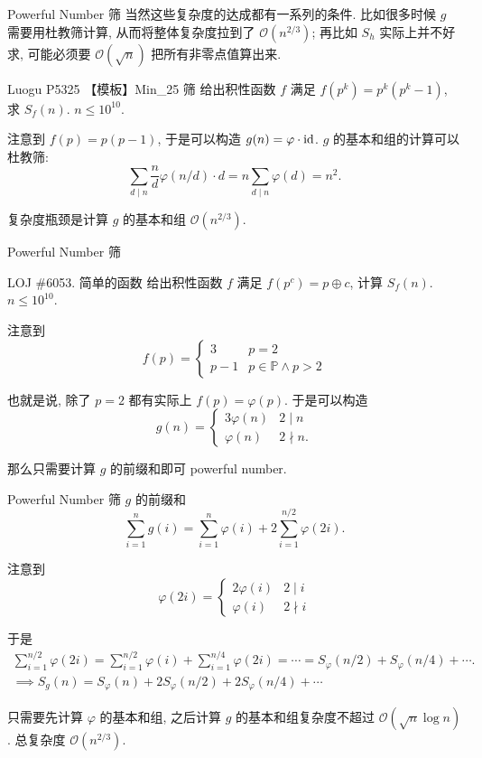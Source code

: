 \documentclass{beamer}
\begin{document}
    \begin{frame}{Powerful Number 筛}
        当然这些复杂度的达成都有一系列的条件. 比如很多时候 $g$ 需要用杜教筛计算, 从而将整体复杂度拉到了 $\mathcal O(n^{2/3})$; 再比如 $S_h$ 实际上并不好求, 可能必须要 $\mathcal O(\sqrt n)$ 把所有非零点值算出来.
        \begin{block}{Luogu P5325 【模板】Min\_25 筛}
            给出积性函数 $f$ 满足 $f(p^k)=p^k(p^k-1)$, 求 $S_f(n)$. $n\leq 10^{10}$.
        \end{block}
        \pause
        注意到 $f(p)=p(p-1)$, 于是可以构造 $g(n)=\varphi\cdot{\rm id}$. $g$ 的基本和组的计算可以杜教筛:
        $$
        \sum_{d\mid n}\frac nd\varphi(n/d)\cdot d=n\sum_{d\mid n}\varphi(d)=n^2.
        $$

        复杂度瓶颈是计算 $g$ 的基本和组 $\mathcal O(n^{2/3})$.
    \end{frame}

    \begin{frame}{Powerful Number 筛}
        \begin{block}{LOJ \#6053. 简单的函数}
            给出积性函数 $f$ 满足 $f(p^c)=p\oplus c$, 计算 $S_f(n)$. $n\leq 10^{10}$.
        \end{block}
        \pause
        注意到
        $$
        f(p)=
        \begin{cases}
            3 & p=2\\
            p-1 & p\in\mathbb P\land p>2
        \end{cases}
        $$

        也就是说, 除了 $p=2$ 都有实际上 $f(p)=\varphi(p)$. 于是可以构造
        $$
        g(n)=\begin{cases}
            3\varphi(n) & 2\mid n\\
            \varphi(n) & 2\nmid n.
        \end{cases}
        $$

        那么只需要计算 $g$ 的前缀和即可 powerful number.
    \end{frame}

    \begin{frame}{Powerful Number 筛}
        $g$ 的前缀和
        $$
        \sum_{i=1}^n g(i)=\sum_{i=1}^n\varphi(i)+2\sum_{i=1}^{n/2}\varphi(2i).
        $$

        注意到
        $$
        \varphi(2i)=\begin{cases}
        2\varphi(i) & 2\mid i\\
        \varphi(i) & 2\nmid i
        \end{cases}
        $$

        于是
        \begin{gather*}
            \sum_{i=1}^{n/2}\varphi(2i)=\sum_{i=1}^{n/2}\varphi(i)+\sum_{i=1}^{n/4}\varphi(2i)=\cdots=S_\varphi(n/2)+S_\varphi(n/4)+\cdots.\\
            \implies S_g(n)=S_\varphi(n)+2S_\varphi(n/2)+2S_\varphi(n/4)+\cdots
        \end{gather*}

        只需要先计算 $\varphi$ 的基本和组, 之后计算 $g$ 的基本和组复杂度不超过 $\mathcal O(\sqrt n\log n)$. 总复杂度 $\mathcal O(n^{2/3})$.
    \end{frame}
\end{document}
